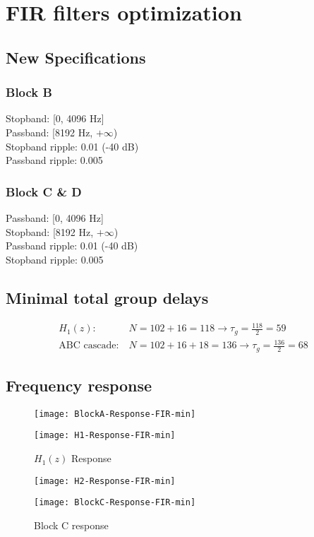 \documentclass{article}
\newenvironment{homeworkProblem}[1]{
	\section{#1}
	}{
}
\newenvironment{homeworkSection}[1]{
	\subsection{#1}
	}{
}
\begin{document}
\begin{homeworkProblem}{FIR filters optimization}
\begin{homeworkSection}{New Specifications}
\subsubsection{Block B}
Stopband: [0, 4096 Hz]\\
Passband: [8192 Hz, $+\infty$)\\
Stopband ripple: 0.01 (-40 dB)\\
Passband ripple: 0.005

\subsubsection{Block C \& D}
Passband: [0, 4096 Hz]\\
Stopband: [8192 Hz, $+\infty$)\\
Passband ripple: 0.01 (-40 dB)\\
Stopband ripple: 0.005
\end{homeworkSection}

\begin{homeworkSection}{Minimal total group delays}
\begin{align*}
H_1(z):\ &N = 102 + 16 = 118 \longrightarrow \tau_g = \frac{118}{2} = 59\\
\text{ABC cascade}:\ &N = 102 + 16 + 18 = 136 \longrightarrow \tau_g = \frac{136}{2} = 68
\end{align*}\end{homeworkSection}

\begin{homeworkSection}{Frequency response}
\begin{figure}[H]
\begin{minipage}[t]{0.5\linewidth}
\centering
\texttt{[image: BlockA-Response-FIR-min]}
\caption{Block A response}
\label{BlockA-Response-FIR-min}
\end{minipage}
\begin{minipage}[t]{0.5\linewidth}
\centering
\texttt{[image: H1-Response-FIR-min]}
\caption{$H_1(z)$ Response}
\label{H1-Response-FIR-min}
\end{minipage}
\end{figure}

\begin{figure}[H]
\begin{minipage}[t]{0.5\linewidth}
\centering
\texttt{[image: H2-Response-FIR-min]}
\caption{$H_2(z)$ Response}
\label{H2-Response-FIR-min}
\end{minipage}
\begin{minipage}[t]{0.5\linewidth}
\centering
\texttt{[image: BlockC-Response-FIR-min]}
\caption{Block C response}
\label{BlockC-Response-FIR-min}
\end{minipage}
\end{figure}


\end{homeworkSection}
\end{homeworkProblem}
\end{document}
